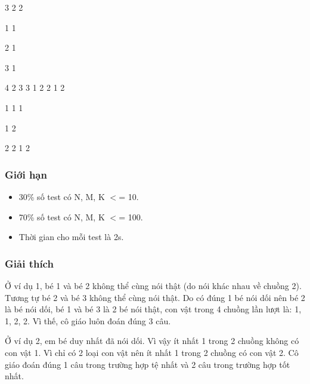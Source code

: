            3 2 2          

           1 1          

           2 1          

           3 1          

           4 2                    3 3                   1 2 2 1 2         

           1 1 1          

           1 2          

           2 2                    1 2         
\\

\subsubsection{     Giới hạn    }
\begin{itemize}
	\item        30\% số test có    N, M, K $<$= 10.      
	\item        70\% số test có    N, M, K $<$= 100.      
	\item        Thời gian cho    mỗi test là 2s.      
\end{itemize}

\subsubsection{     Giải thích    }

      Ở ví dụ 1, bé 1 và bé  2 không thể cùng nói thật (do nói khác nhau về chuồng 2).  Tương tự bé 2 và bé 3 không thể cùng nói thật. Do có  đúng 1 bé nói dối nên bé 2 là bé nói dối, bé 1 và bé  3 là 2 bé nói thật, con vật trong 4 chuồng lần lượt là:  1, 1, 2, 2. Vì thế, cô giáo luôn đoán đúng 3 câu.     

      Ở ví dụ 2, em bé duy  nhất đã nói dối. Vì vậy ít nhất 1 trong 2 chuồng không  có con vật 1. Vì chỉ có 2 loại con vật nên ít nhất 1  trong 2 chuồng có con vật 2. Cô giáo đoán đúng 1 câu trong  trường hợp tệ nhất và 2 câu trong trường hợp tốt nhất.     